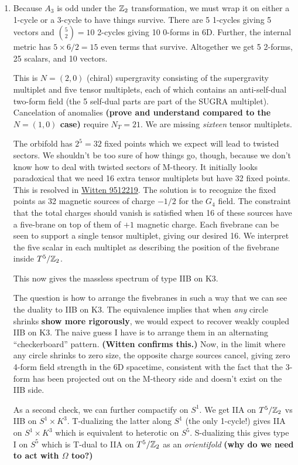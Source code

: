 \documentclass[11pt, class=article, crop=false]{standalone}
\begin{document}
\begin{enumerate}
	
	\item
	 Because $A_3$ is odd under the $\mathbb{Z}_2$ transformation, we must wrap it on either a 1-cycle or a 3-cycle to have things survive. There are 5 1-cycles giving 5 vectors and ${5 \choose 2} = 10$ 2-cycles giving 10 $0$-forms in 6D. Further, the internal metric has $5 \times 6/2 = 15$ even terms that survive. Altogether we get 5 2-forms, 25 scalars, and 10 vectors. 
	
	This is $N=(2,0)$ (chiral) supergravity consisting of the supergravity multiplet and five tensor multiplets, each of which contains an anti-self-dual two-form field (the 5 self-dual parts are part of the SUGRA multiplet). Cancelation of anomalies \textbf{(prove and understand compared to the $N = (1,0)$ case)} require $N_T = 21$. We are missing \emph{sixteen} tensor multiplets.  
	
	
	The orbifold has $2^5 = 32$ fixed points which we expect will lead to twisted sectors. We shouldn't be too sure of how things go, though, because we don't know how to deal with twisted sectors of M-theory. It initially looks paradoxical that we need 16 extra tensor multiplets but have 32 fixed points. This is resolved in \href{https://arxiv.org/pdf/hep-th/9512219.pdf}{Witten 9512219}. The solution is to recognize the fixed points as 32 magnetic sources of charge $-1/2$ for the $G_4$ field. The constraint that the total charges should vanish is satisfied when 16 of these sources have a five-brane on top of them of $+1$ magnetic charge. Each fivebrane can be seen to support a single tensor multiplet, giving our desired 16. We interpret the five scalar in each multiplet as describing the position of the fivebrane inside $T^5/\mathbb{Z}_2$. 
	
	This now gives the massless spectrum of type IIB on K3. 
	
	The question is how to arrange the fivebranes in such a way that we can see the duality to IIB on K3. The equivalence implies that when \emph{any} circle shrinks \textbf{show more rigorously}, we would expect to recover weakly coupled IIB on K3. The naive guess I have is to arrange them in an alternating ``checkerboard'' pattern. \textbf{(Witten confirms this.)} Now, in the limit where any circle shrinks to zero size, the opposite charge sources cancel, giving zero 4-form field strength in the 6D spacetime, consistent with the fact that the 3-form has been projected out on the M-theory side and doesn't exist on the IIB side. 
	
	As a second check, we can further compactify on $S^1$. We get IIA on $T^5/\mathbb{Z}_2$ vs IIB on $S^1 \times K^3$. T-dualizing the latter along $S^1$ (the only 1-cycle!) gives IIA on $S^1 \times K^3$ which is equivalent to heterotic on $S^5$. S-dualizing this gives type I on $S^5$ which is T-dual to IIA on $T^5/\mathbb{Z}_2$  as an \emph{orientifold} \textbf{(why do we need to act with $\Omega$ too?)}
	

\end{enumerate}
\end{document}
